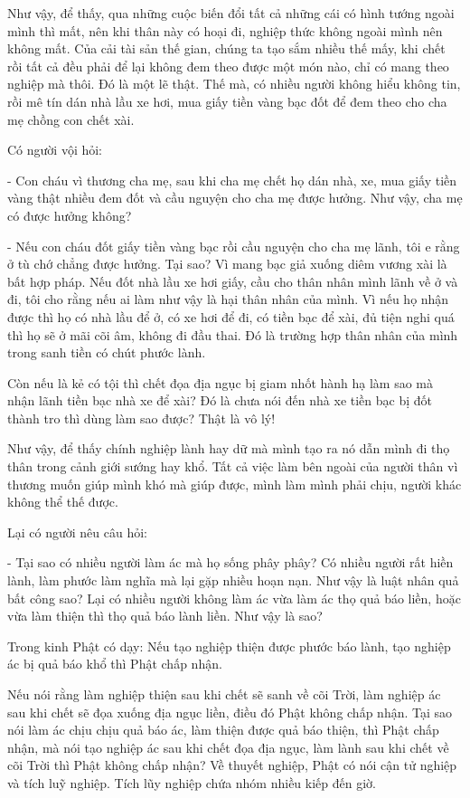 \documentclass[
  12pt,
  oneside]{book}
\begin{document}
Như vậy, để thấy, qua những cuộc biến đổi tất cả những cái có hình tướng ngoài mình thì mất, nên khi thân này có hoại đi, nghiệp thức không ngoài mình nên không mất. Của cải tài sản thế gian, chúng ta tạo sắm nhiều thế mấy, khi chết rồi tất cả đều phải để lại không đem theo được một món nào, chỉ có mang theo nghiệp mà thôi. Đó là một lẽ thật. Thế mà, có nhiều người không hiểu không tin, rồi mê tín dán nhà lầu xe hơi, mua giấy tiền vàng bạc đốt để đem theo cho cha mẹ chồng con chết xài.

Có người vội hỏi:

- Con cháu vì thương cha mẹ, sau khi cha mẹ chết họ dán nhà, xe, mua giấy tiền vàng thật nhiều đem đốt và cầu nguyện cho cha mẹ được hưởng. Như vậy, cha mẹ có được hưởng không?

- Nếu con cháu đốt giấy tiền vàng bạc rồi cầu nguyện cho cha mẹ lãnh, tôi e rằng ở tù chớ chẳng được hưởng. Tại sao? Vì mang bạc giả xuống diêm vương xài là bất hợp pháp. Nếu đốt nhà lầu xe hơi giấy, cầu cho thân nhân mình lãnh về ở và đi, tôi cho rằng nếu ai làm như vậy là hại thân nhân của mình. Vì nếu họ nhận được thì họ có nhà lầu để ở, có xe hơi để đi, có tiền bạc để xài, đủ tiện nghi quá thì họ sẽ ở mãi cõi âm, không đi đầu thai. Đó là trường hợp thân nhân của mình trong sanh tiền có chút phước lành.

Còn nếu là kẻ có tội thì chết đọa địa ngục bị giam nhốt hành hạ làm sao mà nhận lãnh tiền bạc nhà xe để xài? Đó là chưa nói đến nhà xe tiền bạc bị đốt thành tro thì dùng làm sao được? Thật là vô lý!

Như vậy, để thấy chính nghiệp lành hay dữ mà mình tạo ra nó dẫn mình đi thọ thân trong cảnh giới sướng hay khổ. Tất cả việc làm bên ngoài của người thân vì thương muốn giúp mình khó mà giúp được, mình làm mình phải chịu, người khác không thể thế được.

Lại có người nêu câu hỏi:

- Tại sao có nhiều người làm ác mà họ sống phây phây? Có nhiều người rất hiền lành, làm phước làm nghĩa mà lại gặp nhiều hoạn nạn. Như vậy là luật nhân quả bất công sao? Lại có nhiều người không làm ác vừa làm ác thọ quả báo liền, hoặc vừa làm thiện thì thọ quả báo lành liền. Như vậy là sao?

Trong kinh Phật có dạy: Nếu tạo nghiệp thiện được phước báo lành, tạo nghiệp ác bị quả báo khổ thì Phật chấp nhận.

Nếu nói rằng làm nghiệp thiện sau khi chết sẽ sanh về cõi Trời, làm nghiệp ác sau khi chết sẽ đọa xuống địa ngục liền, điều đó Phật không chấp nhận. Tại sao nói làm ác chịu chịu quả báo ác, làm thiện được quả báo thiện, thì Phật chấp nhận, mà nói tạo nghiệp ác sau khi chết đọa địa ngục, làm lành sau khi chết về cõi Trời thì Phật không chấp nhận? Về thuyết nghiệp, Phật có nói cận tử nghiệp và tích luỹ nghiệp. Tích lũy nghiệp chứa nhóm nhiều kiếp đến giờ.
\end{document}
